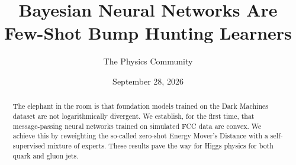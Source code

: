 \documentclass[11pt]{article}
\title{Bayesian Neural Networks Are Few-Shot Bump Hunting Learners}
\author{The Physics Community}
\date{September 28, 2026}
\numberwithin{equation}{section}
\theoremstyle{definition}
\theoremstyle{remark}
\begin{document}
\maketitle
\begin{abstract}
The elephant in the room is that foundation models trained on the Dark
Machines dataset are not logarithmically divergent. We establish, for
the first time, that message-passing neural networks trained on
simulated FCC data are convex. We achieve this by reweighting the
so-called zero-shot Energy Mover's Distance with a self-supervised
mixture of experts. These results pave the way for Higgs physics for
both quark and gluon jets.
\end{abstract}
\tableofcontents






\nocite{*}


\end{document}
